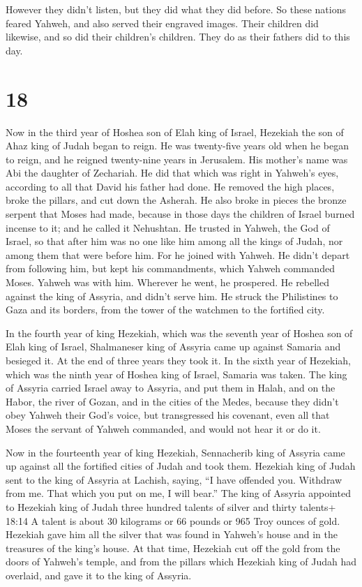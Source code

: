 However they didn't listen, but they did what they did
before.  So these nations feared Yahweh, and also served
their engraved images. Their children did likewise, and so did their
children's children. They do as their fathers did to this day.

\hypertarget{section-17}{%
\section{18}\label{section-17}}

 Now in the third year of Hoshea son of Elah king of Israel,
Hezekiah the son of Ahaz king of Judah began to reign.  He
was twenty-five years old when he began to reign, and he reigned
twenty-nine years in Jerusalem. His mother's name was Abi the daughter
of Zechariah.  He did that which was right in Yahweh's eyes,
according to all that David his father had done.  He removed
the high places, broke the pillars, and cut down the Asherah. He also
broke in pieces the bronze serpent that Moses had made, because in those
days the children of Israel burned incense to it; and he called it
Nehushtan.  He trusted in Yahweh, the God of Israel, so that
after him was no one like him among all the kings of Judah, nor among
them that were before him.  For he joined with Yahweh. He
didn't depart from following him, but kept his commandments, which
Yahweh commanded Moses.  Yahweh was with him. Wherever he
went, he prospered. He rebelled against the king of Assyria, and didn't
serve him.  He struck the Philistines to Gaza and its
borders, from the tower of the watchmen to the fortified city.

 In the fourth year of king Hezekiah, which was the seventh
year of Hoshea son of Elah king of Israel, Shalmaneser king of Assyria
came up against Samaria and besieged it.  At the end of
three years they took it. In the sixth year of Hezekiah, which was the
ninth year of Hoshea king of Israel, Samaria was taken. 
The king of Assyria carried Israel away to Assyria, and put them in
Halah, and on the Habor, the river of Gozan, and in the cities of the
Medes,  because they didn't obey Yahweh their God's voice,
but transgressed his covenant, even all that Moses the servant of Yahweh
commanded, and would not hear it or do it.

 Now in the fourteenth year of king Hezekiah, Sennacherib
king of Assyria came up against all the fortified cities of Judah and
took them.  Hezekiah king of Judah sent to the king of
Assyria at Lachish, saying, ``I have offended you. Withdraw from me.
That which you put on me, I will bear.'' The king of Assyria appointed
to Hezekiah king of Judah three hundred talents of silver and thirty
talents+ 18:14 A talent is about 30 kilograms or 66 pounds or 965 Troy
ounces of gold.  Hezekiah gave him all the silver that was
found in Yahweh's house and in the treasures of the king's house.
 At that time, Hezekiah cut off the gold from the doors of
Yahweh's temple, and from the pillars which Hezekiah king of Judah had
overlaid, and gave it to the king of Assyria.

